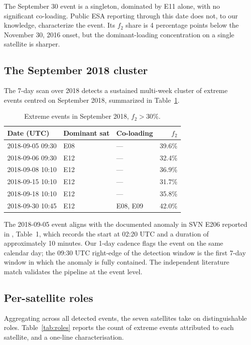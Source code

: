 \documentclass[11pt,a4paper]{article}
\begin{document}
The September 30 event is a singleton, dominated by E11 alone, with no significant co-loading. Public ESA reporting through this date does not, to our knowledge, characterize the event. Its $f_2$ share is 4 percentage points below the November 30, 2016 onset, but the dominant-loading concentration on a single satellite is sharper.

\subsection{The September 2018 cluster}

The 7-day scan over 2018 detects a sustained multi-week cluster of extreme events centred on September 2018, summarized in Table~\ref{tab:sept2018}.

\begin{table}[h]
    \centering
    \caption{Extreme events in September 2018, $f_2 > 30\%$.}
    \label{tab:sept2018}
    \begin{tabular}{lll r}
        \toprule
        Date (UTC) & Dominant sat & Co-loading & $f_2$ \\
        \midrule
        2018-09-05 09:30 & E08 & --- & 39.6\% \\
        2018-09-06 09:30 & E12 & --- & 32.4\% \\
        2018-09-08 10:10 & E12 & --- & 36.9\% \\
        2018-09-15 10:10 & E12 & --- & 31.7\% \\
        2018-09-18 10:10 & E12 & --- & 35.8\% \\
        2018-09-30 10:45 & E12 & E08, E09 & 42.0\% \\
        \bottomrule
    \end{tabular}
\end{table}

The 2018-09-05 event aligns with the documented anomaly in SVN E206 reported in \citet{Galluzzo2021}, Table~1, which records the start at 02:20 UTC and a duration of approximately 10 minutes. Our 1-day cadence flags the event on the same calendar day; the 09:30 UTC right-edge of the detection window is the first 7-day window in which the anomaly is fully contained. The independent literature match validates the pipeline at the event level.

\subsection{Per-satellite roles}

Aggregating across all detected events, the seven satellites take on distinguishable roles. Table~\ref{tab:roles} reports the count of extreme events attributed to each satellite, and a one-line characterisation.
\end{document}
